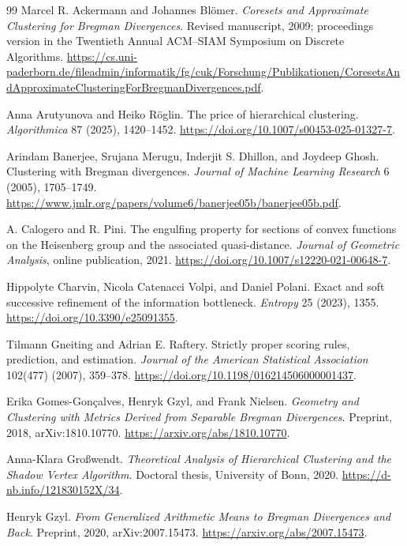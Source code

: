 \documentclass[11pt]{article}
\theoremstyle{definition}\newtheorem{definition}[theorem]{Definition}
\theoremstyle{remark}\newtheorem{remark}[theorem]{Remark}
\begin{document}
\begin{thebibliography}{99}
\small
{}
Marcel R. Ackermann and Johannes Bl\"omer.
\emph{Coresets and Approximate Clustering for Bregman Divergences}.
Revised manuscript, 2009; proceedings version in the Twentieth Annual ACM--SIAM Symposium on Discrete Algorithms.
\url{https://cs.uni-paderborn.de/fileadmin/informatik/fg/cuk/Forschung/Publikationen/CoresetsAndApproximateClusteringForBregmanDivergences.pdf}.

Anna Arutyunova and Heiko R\"oglin.
The price of hierarchical clustering.
\emph{Algorithmica} 87 (2025), 1420--1452.
\url{https://doi.org/10.1007/s00453-025-01327-7}.

Arindam Banerjee, Srujana Merugu, Inderjit S. Dhillon, and Joydeep Ghosh.
Clustering with Bregman divergences.
\emph{Journal of Machine Learning Research} 6 (2005), 1705--1749.
\url{https://www.jmlr.org/papers/volume6/banerjee05b/banerjee05b.pdf}.

A. Calogero and R. Pini.
The engulfing property for sections of convex functions on the Heisenberg group and the associated quasi-distance.
\emph{Journal of Geometric Analysis}, online publication, 2021.
\url{https://doi.org/10.1007/s12220-021-00648-7}.

Hippolyte Charvin, Nicola Catenacci Volpi, and Daniel Polani.
Exact and soft successive refinement of the information bottleneck.
\emph{Entropy} 25 (2023), 1355.
\url{https://doi.org/10.3390/e25091355}.

Tilmann Gneiting and Adrian E. Raftery.
Strictly proper scoring rules, prediction, and estimation.
\emph{Journal of the American Statistical Association} 102(477) (2007), 359--378.
\url{https://doi.org/10.1198/016214506000001437}.

Erika Gomes-Gon\c calves, Henryk Gzyl, and Frank Nielsen.
\emph{Geometry and Clustering with Metrics Derived from Separable Bregman Divergences}.
Preprint, 2018, arXiv:1810.10770.
\url{https://arxiv.org/abs/1810.10770}.

Anna-Klara Gro\ss wendt.
\emph{Theoretical Analysis of Hierarchical Clustering and the Shadow Vertex Algorithm}.
Doctoral thesis, University of Bonn, 2020.
\url{https://d-nb.info/121830152X/34}.

Henryk Gzyl.
\emph{From Generalized Arithmetic Means to Bregman Divergences and Back}.
Preprint, 2020, arXiv:2007.15473.
\url{https://arxiv.org/abs/2007.15473}.


\end{thebibliography}
\end{document}
